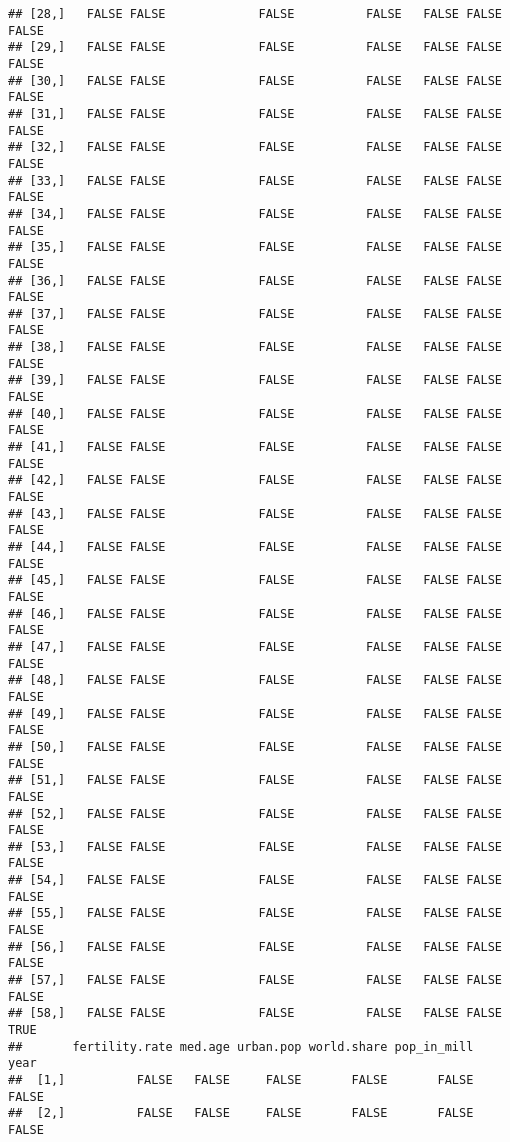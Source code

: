 \documentclass[
]{article}
\begin{document}
\begin{verbatim}
## [28,]   FALSE FALSE             FALSE          FALSE   FALSE FALSE    FALSE
## [29,]   FALSE FALSE             FALSE          FALSE   FALSE FALSE    FALSE
## [30,]   FALSE FALSE             FALSE          FALSE   FALSE FALSE    FALSE
## [31,]   FALSE FALSE             FALSE          FALSE   FALSE FALSE    FALSE
## [32,]   FALSE FALSE             FALSE          FALSE   FALSE FALSE    FALSE
## [33,]   FALSE FALSE             FALSE          FALSE   FALSE FALSE    FALSE
## [34,]   FALSE FALSE             FALSE          FALSE   FALSE FALSE    FALSE
## [35,]   FALSE FALSE             FALSE          FALSE   FALSE FALSE    FALSE
## [36,]   FALSE FALSE             FALSE          FALSE   FALSE FALSE    FALSE
## [37,]   FALSE FALSE             FALSE          FALSE   FALSE FALSE    FALSE
## [38,]   FALSE FALSE             FALSE          FALSE   FALSE FALSE    FALSE
## [39,]   FALSE FALSE             FALSE          FALSE   FALSE FALSE    FALSE
## [40,]   FALSE FALSE             FALSE          FALSE   FALSE FALSE    FALSE
## [41,]   FALSE FALSE             FALSE          FALSE   FALSE FALSE    FALSE
## [42,]   FALSE FALSE             FALSE          FALSE   FALSE FALSE    FALSE
## [43,]   FALSE FALSE             FALSE          FALSE   FALSE FALSE    FALSE
## [44,]   FALSE FALSE             FALSE          FALSE   FALSE FALSE    FALSE
## [45,]   FALSE FALSE             FALSE          FALSE   FALSE FALSE    FALSE
## [46,]   FALSE FALSE             FALSE          FALSE   FALSE FALSE    FALSE
## [47,]   FALSE FALSE             FALSE          FALSE   FALSE FALSE    FALSE
## [48,]   FALSE FALSE             FALSE          FALSE   FALSE FALSE    FALSE
## [49,]   FALSE FALSE             FALSE          FALSE   FALSE FALSE    FALSE
## [50,]   FALSE FALSE             FALSE          FALSE   FALSE FALSE    FALSE
## [51,]   FALSE FALSE             FALSE          FALSE   FALSE FALSE    FALSE
## [52,]   FALSE FALSE             FALSE          FALSE   FALSE FALSE    FALSE
## [53,]   FALSE FALSE             FALSE          FALSE   FALSE FALSE    FALSE
## [54,]   FALSE FALSE             FALSE          FALSE   FALSE FALSE    FALSE
## [55,]   FALSE FALSE             FALSE          FALSE   FALSE FALSE    FALSE
## [56,]   FALSE FALSE             FALSE          FALSE   FALSE FALSE    FALSE
## [57,]   FALSE FALSE             FALSE          FALSE   FALSE FALSE    FALSE
## [58,]   FALSE FALSE             FALSE          FALSE   FALSE FALSE     TRUE
##       fertility.rate med.age urban.pop world.share pop_in_mill  year
##  [1,]          FALSE   FALSE     FALSE       FALSE       FALSE FALSE
##  [2,]          FALSE   FALSE     FALSE       FALSE       FALSE FALSE

\end{verbatim}
\end{document}
